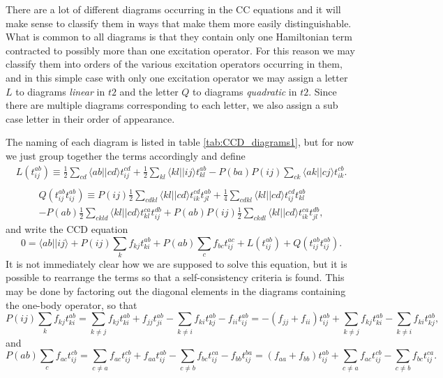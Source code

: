 There are a lot of different diagrams occurring in the CC
equations and it will make sense to classify them in ways that make
them more easily distinguishable. What is common to all diagrams is that
they contain only one Hamiltonian term contracted to possibly more
than one excitation operator. For this reason we may classify them
into orders of the various excitation operators occurring in them, and
in this simple case with only one excitation operator we may assign a
letter $L$ to diagrams \emph{linear} in $t2$ and the letter $Q$ to diagrams
\emph{quadratic} in $t2$. Since there are multiple diagrams
corresponding to each letter, we also assign a sub case letter in
their order of appearance.

The naming of each diagram is listed in table
\ref{tab:CCD_diagrams1}, but for now we just group together the terms
accordingly and define
\begin{multline}
L(t^{ab}_{ij}) \equiv 
\frac{1}{2} \sum_{cd} \langle ab \vert \vert cd \rangle t_{ij}^{cd} +
\frac{1}{2} \sum_{kl} \langle kl \vert \vert ij \rangle t_{kl}^{ab}-
P(ba)P(ij) \sum_{ck} \langle ak \vert \vert cj \rangle t_{ik}^{cb} .\\ 
\end{multline}
\begin{multline}
Q(t^{ab}_{ij}t^{ab}_{ij}) \equiv 
P(ij)\frac{1}{2} \sum_{cdkl} \langle kl \vert \vert cd \rangle t_{ik}^{cd} t_{jl}^{ab} 
+\frac{1}{4} \sum_{cdkl} \langle kl \vert \vert cd \rangle t_{ij}^{cd} t_{kl}^{ab} \\ - 
P(ab)\frac{1}{2} \sum_{ckld} \langle kl \vert \vert cd \rangle t_{kl}^{ca} t_{ij}^{db}+
P(ab)P(ij)\frac{1}{2} \sum_{ckdl} \langle kl \vert \vert cd \rangle t_{ik}^{ca} t_{jl}^{db},
\end{multline}
and write the CCD equation
\begin{equation}
0 =\langle ab \vert \vert ij \rangle + P(ij) \sum_{k} f_{kj} t_{ki}^{ab}+P(ab) \sum_{c} f_{bc} t_{ij}^{ac} + L(t^{ab}_{ij}) + Q(t^{ab}_{ij}t^{ab}_{ij}).
\end{equation}
It is not immediately clear how we are supposed to solve this
equation, but it is possible to rearrange the terms so that a
self-consistency criteria is found. This may be done by factoring out
the diagonal elements in the diagrams containing the one-body
operator, so that
\begin{equation}
P(ij) \sum_{k} f_{kj} t_{ki}^{ab} = \sum_{k \neq j} f_{kj} t_{ki}^{ab} + f_{jj} t_{ji}^{ab} - \sum_{k \neq i} f_{ki} t_{kj}^{ab}   - f_{ii} t_{ij}^{ab} =  -(f_{jj} + f_{ii}) t_{ij}^{ab} + \sum_{k \neq j} f_{kj} t_{ki}^{ab}  - \sum_{k \neq i} f_{ki} t_{kj}^{ab}  ,
\end{equation}
and
\begin{equation}
P(ab) \sum_{c} f_{ac} t_{ij}^{cb} = \sum_{c \neq a} f_{ac} t_{ij}^{cb} + f_{aa} t_{ij}^{ab} - \sum_{c \neq b} f_{bc} t_{ij}^{ca} -   f_{bb} t_{ij}^{ba} = (f_{aa} + f_{bb}) t_{ij}^{ab} +  \sum_{c \neq a} f_{ac} t_{ij}^{cb} - \sum_{c \neq b} f_{bc} t_{ij}^{ca}.
\end{equation}

